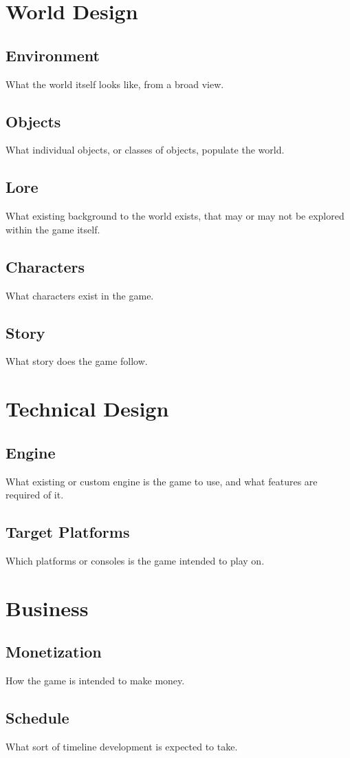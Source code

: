 \section{World Design}
\subsection{Environment}
What the world itself looks like, from a broad view.
\subsection{Objects}
What individual objects, or classes of objects, populate the world.
\subsection{Lore}
What existing background to the world exists, that may or may not be explored within the game itself.
\subsection{Characters}
What characters exist in the game.
\subsection{Story}
What story does the game follow.

\section{Technical Design}
\subsection{Engine}
What existing or custom engine is the game to use, and what features are required of it.
\subsection{Target Platforms}
Which platforms or consoles is the game intended to play on.

\section{Business}
\subsection{Monetization}
How the game is intended to make money.
\subsection{Schedule}
What sort of timeline development is expected to take.

